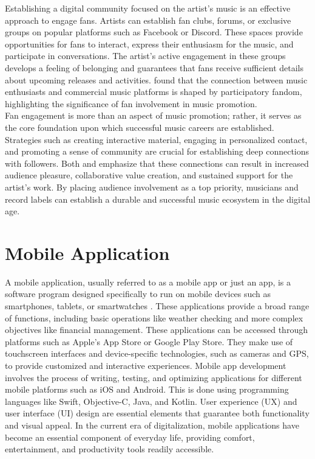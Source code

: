 Establishing a digital community focused on the artist's music is an effective approach to engage fans. Artists can establish fan clubs, forums, or exclusive groups on popular platforms such as Facebook or Discord. These spaces provide opportunities for fans to interact, express their enthusiasm for the music, and participate in conversations. The artist's active engagement in these groups develops a feeling of belonging and guarantees that fans receive sufficient details about upcoming releases and activities. \textcite{lee20} found that the connection between music enthusiasts and commercial music platforms is shaped by participatory fandom, highlighting the significance of fan involvement in music promotion. \\

Fan engagement is more than an aspect of music promotion; rather, it serves as the core foundation upon which successful music careers are established. Strategies such as creating interactive material, engaging in personalized contact, and promoting a sense of community are crucial for establishing deep connections with followers. Both \textcite{edlom21} and \textcite{lee20} emphasize that these connections can result in increased audience pleasure, collaborative value creation, and sustained support for the artist's work. By placing audience involvement as a top priority, musicians and record labels can establish a durable and successful music ecosystem in the digital age.

\section{Mobile Application}
A mobile application, usually referred to as a mobile app or just an app, is a software program designed specifically to run on mobile devices such as smartphones, tablets, or smartwatches \parencite{ramdurai21}. These applications provide a broad range of functions, including basic operations like weather checking and more complex objectives like financial management. These applications can be accessed through platforms such as Apple's App Store or Google Play Store. They make use of touchscreen interfaces and device-specific technologies, such as cameras and GPS, to provide customized and interactive experiences. Mobile app development involves the process of writing, testing, and optimizing applications for different mobile platforms such as iOS and Android. This is done using programming languages like Swift, Objective-C, Java, and Kotlin. User experience (UX) and user interface (UI) design are essential elements that guarantee both functionality and visual appeal. In the current era of digitalization, mobile applications have become an essential component of everyday life, providing comfort, entertainment, and productivity tools readily accessible.

